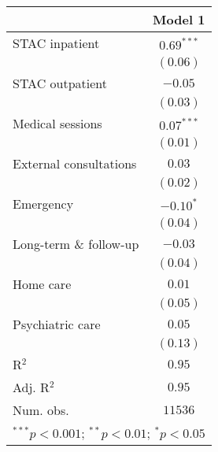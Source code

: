 
\usepackage{booktabs}

\begin{tabular}{l c}
\toprule
 & Model 1 \\
\midrule
STAC inpatient         & $0.69^{***}$ \\
                       & $(0.06)$     \\
STAC outpatient        & $-0.05$      \\
                       & $(0.03)$     \\
Medical sessions       & $0.07^{***}$ \\
                       & $(0.01)$     \\
External consultations & $0.03$       \\
                       & $(0.02)$     \\
Emergency              & $-0.10^{*}$  \\
                       & $(0.04)$     \\
Long-term \& follow-up & $-0.03$      \\
                       & $(0.04)$     \\
Home care              & $0.01$       \\
                       & $(0.05)$     \\
Psychiatric care       & $0.05$       \\
                       & $(0.13)$     \\
\midrule
R$^2$                  & $0.95$       \\
Adj. R$^2$             & $0.95$       \\
Num. obs.              & $11536$      \\
\bottomrule
\multicolumn{2}{l}{\scriptsize{$^{***}p<0.001$; $^{**}p<0.01$; $^{*}p<0.05$}}
\end{tabular}
